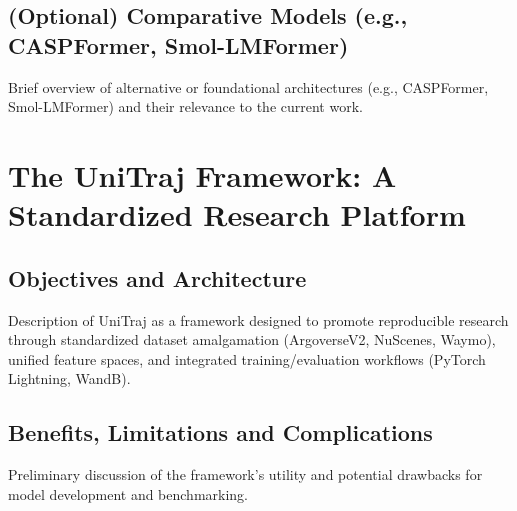     \subsection{(Optional) Comparative Models (e.g., CASPFormer, Smol-LMFormer)}
    Brief overview of alternative or foundational architectures (e.g., CASPFormer, Smol-LMFormer) and their relevance to the current work.

\section{The UniTraj Framework: A Standardized Research Platform}
\label{sec:bg_unitraj_main}
    \subsection{Objectives and Architecture}
    Description of UniTraj as a framework designed to promote reproducible research through standardized dataset amalgamation (ArgoverseV2, NuScenes, Waymo), unified feature spaces, and integrated training/evaluation workflows (PyTorch Lightning, WandB).
    \subsection{Benefits, Limitations and Complications}
    Preliminary discussion of the framework's utility and potential drawbacks for model development and benchmarking.
